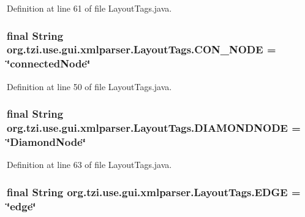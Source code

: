 Definition at line 61 of file Layout\-Tags.\-java.

\hypertarget{classorg_1_1tzi_1_1use_1_1gui_1_1xmlparser_1_1_layout_tags_acef82e81136563cbeaefeca5e17c53c0}{
\subsubsection[{C\-O\-N\-\_\-\-N\-O\-D\-E}]{\setlength{\rightskip}{0pt plus 5cm}final String org.\-tzi.\-use.\-gui.\-xmlparser.\-Layout\-Tags.\-C\-O\-N\-\_\-\-N\-O\-D\-E = \char`\"{}connected\-Node\char`\"{}\hspace{0.3cm}{\ttfamily [static]}}}\label{classorg_1_1tzi_1_1use_1_1gui_1_1xmlparser_1_1_layout_tags_acef82e81136563cbeaefeca5e17c53c0}


Definition at line 50 of file Layout\-Tags.\-java.

\hypertarget{classorg_1_1tzi_1_1use_1_1gui_1_1xmlparser_1_1_layout_tags_a064efcfb396623a71caa5390834a87f7}{
\subsubsection[{D\-I\-A\-M\-O\-N\-D\-N\-O\-D\-E}]{\setlength{\rightskip}{0pt plus 5cm}final String org.\-tzi.\-use.\-gui.\-xmlparser.\-Layout\-Tags.\-D\-I\-A\-M\-O\-N\-D\-N\-O\-D\-E = \char`\"{}Diamond\-Node\char`\"{}\hspace{0.3cm}{\ttfamily [static]}}}\label{classorg_1_1tzi_1_1use_1_1gui_1_1xmlparser_1_1_layout_tags_a064efcfb396623a71caa5390834a87f7}


Definition at line 63 of file Layout\-Tags.\-java.

\hypertarget{classorg_1_1tzi_1_1use_1_1gui_1_1xmlparser_1_1_layout_tags_a1f796571c98a8a5bd75a302bdf2f4a19}{
\subsubsection[{E\-D\-G\-E}]{\setlength{\rightskip}{0pt plus 5cm}final String org.\-tzi.\-use.\-gui.\-xmlparser.\-Layout\-Tags.\-E\-D\-G\-E = \char`\"{}edge\char`\"{}\hspace{0.3cm}{\ttfamily [static]}}}\label{classorg_1_1tzi_1_1use_1_1gui_1_1xmlparser_1_1_layout_tags_a1f796571c98a8a5bd75a302bdf2f4a19}


